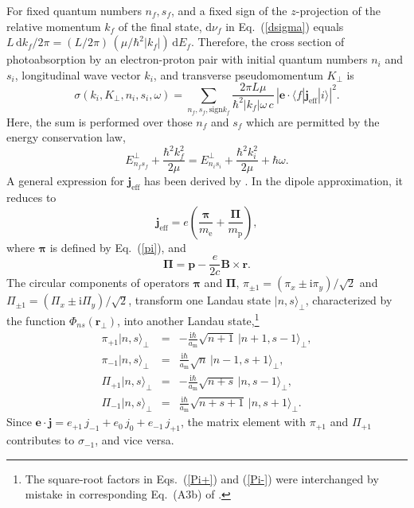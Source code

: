 \documentclass{emulateapj}
\newcommand{\beq}{\begin{equation}}
\newcommand{\eeq}{\end{equation}}
\newcommand{\bea}{\begin{eqnarray}}
\newcommand{\eea}{\end{eqnarray}}
\newcommand{\req}[1]{Eq.\ (\ref{#1})}
\newcommand{\mel}{m_\mathrm{e}}
\newcommand{\mpr}{m_\mathrm{p}}
\newcommand{\dd}{\mathrm{d}}
\newcommand{\am}{a_\mathrm{m}}
\begin{document}
\begin{appendix}
For fixed quantum numbers $n_f,s_f$,
and a fixed sign of the $z$-projection of the relative momentum
$k_f$ of the final state, $\dd\nu_f$ in \req{dsigma}
equals $L\,\dd k_f/2\pi=(L/2\pi)\,(\mu/\hbar^2 |k_f|)\,\dd E_f$.
Therefore, the cross section of photoabsorption by an electron-proton 
pair with initial quantum numbers $n_i$ and $s_i$, longitudinal wave vector
$k_i$, and transverse pseudomomentum $K_\perp$ is
\beq
   \sigma(k_i, K_\perp, n_i, s_i, \omega) =
   \sum_{n_f,s_f,\mathrm{sign}k_f} 
   \frac{2\pi L \mu}{\hbar^2 |k_f| \omega\,c}\,
   \left|\bm{e}\cdot\langle f | \bm{j}_\mathrm{eff} | i \rangle
   \right|^2 .
\label{partial}
\eeq
Here, the sum is performed over those $n_f$ and $s_f$ which are
permitted by the energy conservation law,
\beq
   E_{n_f s_f}^\perp + \frac{\hbar^2 k_f^2}{2\mu}
   = E_{n_i s_i}^\perp + \frac{\hbar^2 k_i^2}{2\mu} + \hbar\omega .
\label{en-conserv}
\eeq
A general expression for 
$\bm{j}_\mathrm{eff}$ has been derived by 
\citet{PP97}. In the dipole approximation,
it reduces to
\beq
 \bm{j}_\mathrm{eff} = e \left(\frac{\bm{\pi}}{\mel}
 + \frac{\bm{\Pi}}{\mpr} \right),
\label{jeff}
\eeq
where $\bm{\pi}$ is defined by \req{pi}, and
\beq
   \bm{\Pi} = \bm{p}-\frac{e}{2c}\bm{B}\times\bm{r}.
\eeq
The circular components
of operators $\bm{\pi}$ and $\bm{\Pi}$,
$\pi_{\pm1}=(\pi_x\pm\mathrm{i}\pi_y)/\sqrt{2}$ 
and $\Pi_{\pm1}=(\Pi_x\pm\mathrm{i}\Pi_y)/\sqrt{2}$,
transform one Landau state $|n,s\rangle_\perp$,
characterized by the function $\Phi_{ns}(\bm{r}_\perp)$,
into another Landau state,\footnote{%
The square-root factors in Eqs.\ (\ref{Pi+}) and (\ref{Pi-})
were interchanged by mistake 
in corresponding Eq.\ (A3b) of \citet{PP97}.
}
\begin{subequations}
\label{pi+-}
\bea
   \pi_{+1} |n,s\rangle_\perp &=& - \frac{\mathrm{i}\hbar}{\am}
   \sqrt{n+1}\,|n+1,s-1\rangle_\perp,
\\
   \pi_{-1} |n,s\rangle_\perp &=&  \frac{\mathrm{i}\hbar}{\am}
   \sqrt{n}\,|n-1,s+1\rangle_\perp,
\\
   \Pi_{+1} |n,s\rangle_\perp &=& - \frac{\mathrm{i}\hbar}{\am}
   \sqrt{n+s}\,|n,s-1\rangle_\perp,
\label{Pi+}
\\
   \Pi_{-1} |n,s\rangle_\perp &=&  \frac{\mathrm{i}\hbar}{\am}
   \sqrt{n+s+1}\,|n,s+1\rangle_\perp.
\label{Pi-}
\eea
\end{subequations}
Since $\bm{e}\cdot\bm{j}=
e_{+1}\, j_{-1} + e_0\, j_0 + e_{-1}\, j_{+1}$,
the matrix element with $\pi_{+1}$ and $\Pi_{+1}$ 
contributes to $\sigma_{-1}$, and vice versa.


\end{appendix}
\end{document}
